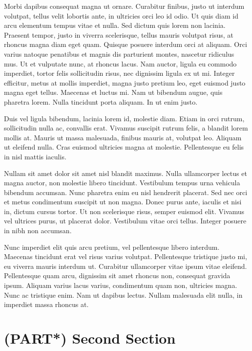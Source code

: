 \documentclass[
]{book}
\begin{document}
Morbi dapibus consequat magna ut ornare. Curabitur finibus, justo ut interdum volutpat, tellus velit lobortis ante, in ultricies orci leo id odio. Ut quis diam id arcu elementum tempus vitae et nulla. Sed dictum quis lorem non lacinia. Praesent tempor, justo in viverra scelerisque, tellus mauris volutpat risus, at rhoncus magna diam eget quam. Quisque posuere interdum orci at aliquam. Orci varius natoque penatibus et magnis dis parturient montes, nascetur ridiculus mus. Ut et vulputate nunc, at rhoncus lacus. Nam auctor, ligula eu commodo imperdiet, tortor felis sollicitudin risus, nec dignissim ligula ex ut mi. Integer efficitur, metus at mollis imperdiet, magna justo pretium leo, eget euismod justo magna eget tellus. Maecenas et luctus mi. Nam ut bibendum augue, quis pharetra lorem. Nulla tincidunt porta aliquam. In ut enim justo.

Duis vel ligula bibendum, lacinia lorem id, molestie diam. Etiam in orci rutrum, sollicitudin nulla ac, convallis erat. Vivamus suscipit rutrum felis, a blandit lorem mollis at. Mauris ut massa malesuada, finibus mauris at, volutpat leo. Aliquam ut eleifend nulla. Cras euismod ultricies magna at molestie. Pellentesque eu felis in nisl mattis iaculis.

Nullam sit amet dolor sit amet nisl blandit maximus. Nulla ullamcorper lectus et magna auctor, non molestie libero tincidunt. Vestibulum tempus urna vehicula bibendum accumsan. Nunc pharetra enim eu nisl hendrerit placerat. Sed nec orci et metus condimentum suscipit ut non magna. Donec purus ante, iaculis et nisi in, dictum cursus tortor. Ut non scelerisque risus, semper euismod elit. Vivamus vel ultrices purus, ut placerat dolor. Vestibulum vitae orci tellus. Integer posuere in nibh non accumsan.

Nunc imperdiet elit quis arcu pretium, vel pellentesque libero interdum. Maecenas tincidunt erat vel risus varius volutpat. Pellentesque tristique justo mi, eu viverra mauris interdum ut. Curabitur ullamcorper vitae ipsum vitae eleifend. Pellentesque quam arcu, dignissim sit amet rhoncus non, consequat gravida ipsum. Aliquam varius lacus varius, condimentum quam non, ultricies magna. Nunc ac tristique enim. Nam ut dapibus lectus. Nullam malesuada elit nulla, in imperdiet massa rhoncus at.

\hypertarget{part-second-section}{%
\chapter{(PART*) Second Section}\label{part-second-section}}
\end{document}
